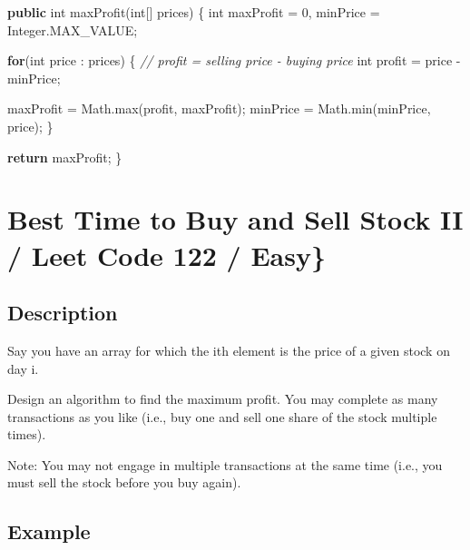 \documentclass[]{book}
\newenvironment{Shaded}{\begin{snugshade}}{\end{snugshade}}
\newcommand{\BuiltInTok}[1]{#1}
\newcommand{\CommentTok}[1]{\textcolor[rgb]{0.56,0.35,0.01}{\textit{#1}}}
\newcommand{\DataTypeTok}[1]{\textcolor[rgb]{0.13,0.29,0.53}{#1}}
\newcommand{\DecValTok}[1]{\textcolor[rgb]{0.00,0.00,0.81}{#1}}
\newcommand{\FunctionTok}[1]{\textcolor[rgb]{0.00,0.00,0.00}{#1}}
\newcommand{\KeywordTok}[1]{\textcolor[rgb]{0.13,0.29,0.53}{\textbf{#1}}}
\newcommand{\NormalTok}[1]{#1}
\begin{document}
\begin{Shaded}
\begin{Highlighting}[]
\KeywordTok{public} \DataTypeTok{int} \FunctionTok{maxProfit}\NormalTok{(}\DataTypeTok{int}\NormalTok{[] prices) \{}
    \DataTypeTok{int}\NormalTok{ maxProfit = }\DecValTok{0}\NormalTok{, minPrice = }\BuiltInTok{Integer}\NormalTok{.}\FunctionTok{MAX_VALUE}\NormalTok{;}

    \KeywordTok{for}\NormalTok{(}\DataTypeTok{int}\NormalTok{ price : prices) \{}
        \CommentTok{// profit = selling price - buying price}
        \DataTypeTok{int}\NormalTok{ profit = price - minPrice;}

\NormalTok{        maxProfit = }\BuiltInTok{Math}\NormalTok{.}\FunctionTok{max}\NormalTok{(profit, maxProfit);}
\NormalTok{        minPrice = }\BuiltInTok{Math}\NormalTok{.}\FunctionTok{min}\NormalTok{(minPrice, price);}
\NormalTok{    \}}

    \KeywordTok{return}\NormalTok{ maxProfit;}
\NormalTok{\}}
\end{Highlighting}
\end{Shaded}

\hypertarget{best-time-to-buy-and-sell-stock-ii-leet-code-122-easy}{%
\section{Best Time to Buy and Sell Stock II / Leet Code 122 / Easy\}}\label{best-time-to-buy-and-sell-stock-ii-leet-code-122-easy}}

\hypertarget{description-34}{%
\subsection{Description}\label{description-34}}

Say you have an array for which the ith element is the price of a given stock on day i.

Design an algorithm to find the maximum profit. You may complete as many transactions as you like (i.e., buy one and
sell one share of the stock multiple times).

Note: You may not engage in multiple transactions at the same time (i.e., you must sell the stock before you buy
again).

\hypertarget{example-33}{%
\subsection{Example}\label{example-33}}
\end{document}
